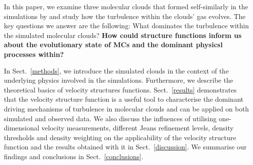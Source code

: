 In this paper, we examine three molecular clouds that formed self-similarly in the simulations by \citet[ and , hereafter]{IbanezMejia2016,IbanezMejia2017} and study how the turbulence within the clouds' gas evolves.
The key questions we answer are the following: 
What dominates the turbulence within the simulated molecular clouds? 
\textbf{How could structure functions inform us about the evolutionary state of MCs and the dominant physicsl processes within?}

In Sect.~\ref{methods}, we introduce the simulated clouds in the context of the underlying physics involved in the simulations.
Furthermore, we describe the theoretical basics of velocity structures functions.
Sect.~\ref{results} demonstrates that the velocity structure function is a useful tool to characterise the dominant driving mechanisms of turbulence in molecular clouds and can be applied on both simulated and observed data. 
We also discuss the influences of utilising one-dimensional velocity measurements, different Jeans refinement levels, density thresholds and density weighting on the applicability of the velocity structure function and the results obtained with it in Sect.~\ref{discussion}.  
We summarise our findings and conclusions in Sect.~\ref{conclusions}.



\endinput
